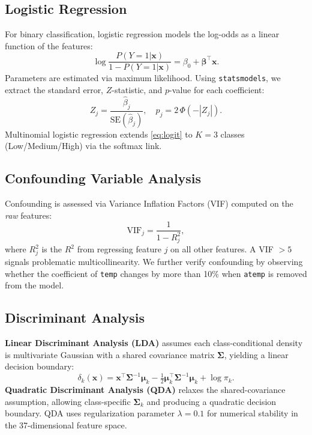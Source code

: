 \documentclass[conference]{IEEEtran}
\begin{document}
\subsection{Logistic Regression}
For binary classification, logistic regression models the log-odds as a linear function of the features:
\begin{equation}
\log\frac{P(Y=1|\mathbf{x})}{1-P(Y=1|\mathbf{x})} = \beta_0 + \boldsymbol{\beta}^\top \mathbf{x}.
\label{eq:logit}
\end{equation}
Parameters are estimated via maximum likelihood.
Using \texttt{statsmodels}, we extract the standard error, $Z$-statistic, and $p$-value for each coefficient:
\begin{equation}
Z_j = \frac{\hat{\beta}_j}{\mathrm{SE}(\hat{\beta}_j)}, \quad p_j = 2\,\Phi(-|Z_j|).
\end{equation}
Multinomial logistic regression extends \eqref{eq:logit} to $K=3$ classes (Low/Medium/High) via the softmax link.

\subsection{Confounding Variable Analysis}
\label{sec:confounding}
Confounding is assessed via Variance Inflation Factors (VIF) computed on the \emph{raw} features:
\begin{equation}
\mathrm{VIF}_j = \frac{1}{1 - R_j^2},
\end{equation}
where $R_j^2$ is the $R^2$ from regressing feature $j$ on all other features.
A VIF $> 5$ signals problematic multicollinearity.
We further verify confounding by observing whether the coefficient of \texttt{temp} changes by more than 10\% when \texttt{atemp} is removed from the model.

\subsection{Discriminant Analysis}
\textbf{Linear Discriminant Analysis (LDA)} assumes each class-conditional density is multivariate Gaussian with a shared covariance matrix $\boldsymbol{\Sigma}$, yielding a linear decision boundary:
\begin{equation}
\delta_k(\mathbf{x}) = \mathbf{x}^\top \boldsymbol{\Sigma}^{-1}\boldsymbol{\mu}_k - \tfrac{1}{2}\boldsymbol{\mu}_k^\top \boldsymbol{\Sigma}^{-1}\boldsymbol{\mu}_k + \log\pi_k.
\end{equation}
\textbf{Quadratic Discriminant Analysis (QDA)} relaxes the shared-covariance assumption, allowing class-specific $\boldsymbol{\Sigma}_k$ and producing a quadratic decision boundary.
QDA uses regularization parameter $\lambda=0.1$ for numerical stability in the 37-dimensional feature space.
\end{document}
